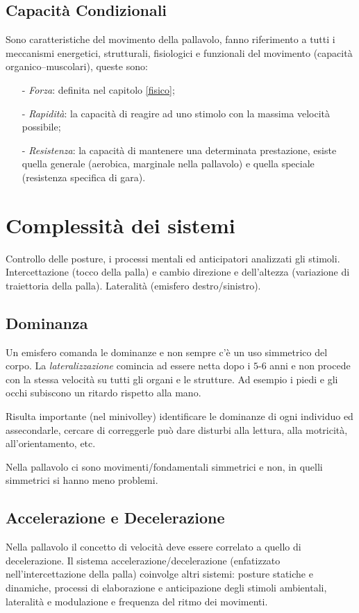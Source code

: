 \subsection{Capacità Condizionali}
Sono caratteristiche del movimento della pallavolo, fanno riferimento a 
tutti i meccanismi energetici, strutturali, fisiologici e funzionali del
movimento (capacità organico--muscolari), queste sono:
\begin{itemize}
\item[-]\emph{Forza}: definita nel capitolo \ref{fisico};
\item[-]\emph{Rapidità}: la capacità di reagire ad uno stimolo con la massima
velocità possibile;
\item[-]\emph{Resistenza}:  la capacità di mantenere una
 determinata prestazione, esiste quella generale (aerobica, marginale nella
 pallavolo) e quella speciale (resistenza specifica di gara).
\end{itemize}


\section{Complessità dei sistemi}
Controllo delle posture, i processi mentali ed anticipatori analizzati gli
stimoli. Intercettazione (tocco della palla) e cambio direzione e dell'altezza
(variazione di traiettoria della palla). Lateralità (emisfero destro/sinistro).

\subsection{Dominanza}
Un emisfero comanda le dominanze e non sempre c'è un uso simmetrico del corpo.
La \emph{lateralizzazione} comincia ad essere netta dopo i $5$-$6$ anni e
non procede con la stessa velocità su tutti gli organi e le strutture. Ad
esempio i piedi e gli occhi subiscono un ritardo rispetto alla mano.

Risulta importante (nel minivolley) identificare le dominanze di ogni individuo
ed assecondarle, cercare di correggerle può dare disturbi alla lettura, alla
motricità, all'orientamento, etc.

Nella pallavolo ci sono movimenti/fondamentali simmetrici e non, in quelli
simmetrici si hanno meno problemi.

\subsection{Accelerazione e Decelerazione}
Nella pallavolo il concetto di velocità deve essere correlato a quello di
decelerazione. Il sistema accelerazione/decelerazione (enfatizzato
nell'intercettazione della palla) coinvolge altri sistemi: posture statiche e
dinamiche, processi di elaborazione e anticipazione degli stimoli ambientali,
lateralità e modulazione e frequenza del ritmo dei movimenti.

